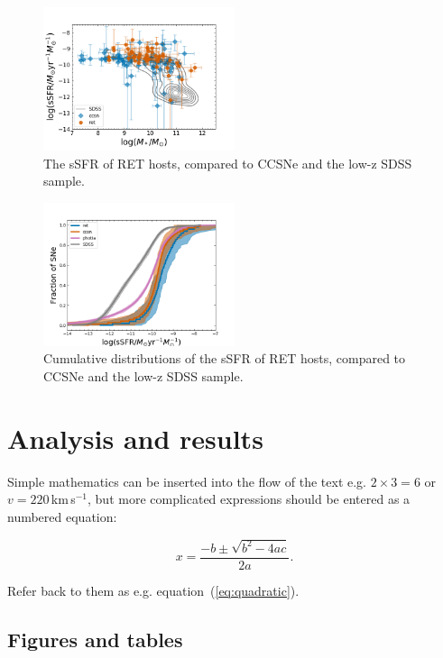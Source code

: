 \documentclass[fleqn,usenatbib,]{mnras}
\begin{document}
\begin{figure}
\includegraphics[width=0.5\textwidth]{figs/sSFR_Mike.png}
\caption{The sSFR of RET hosts, compared to CCSNe and the low-z SDSS sample.
\label{fig:sfms_ssfr}}
\end{figure}

\begin{figure}
\includegraphics[width=0.5\textwidth]{figs/cum_sSFR_mike.png}
\caption{Cumulative distributions of the sSFR of RET hosts, compared to CCSNe and the low-z SDSS sample.
\label{fig:sfr_cum}}
\end{figure}


\section{Analysis and results}
\label{sec:analysis} %

Simple mathematics can be inserted into the flow of the text e.g. $2\times3=6$
or $v=220$\,km\,s$^{-1}$, but more complicated expressions should be entered
as a numbered equation:

\begin{equation}
    x=\frac{-b\pm\sqrt{b^2-4ac}}{2a}.
	\label{eq:quadratic}
\end{equation}

Refer back to them as e.g. equation~(\ref{eq:quadratic}).

\subsection{Figures and tables}
\end{document}
